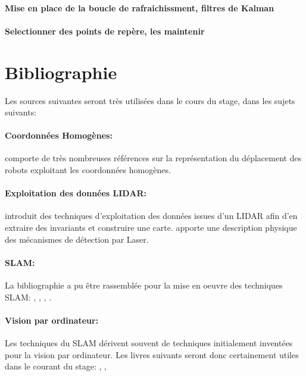 \documentclass[12pt,a4paper]{report}
\begin{document}
\paragraph{Mise en place de la boucle de rafraichissment, filtres de Kalman}

\paragraph{Selectionner des points de repère, les maintenir}

\section{Bibliographie}

Les sources suivantes seront très utilisées dans le cours du stage, dans les sujets suivants:

\paragraph{Coordonnées Homogènes:} \cite{gogu_representation_1997} comporte de très nombreuses références sur la représentation du déplacement des robots exploitant les coordonnées homogènes.

\paragraph{Exploitation des données LIDAR:} \cite{sjostedt_lidar_2011} introduit des techniques d'exploitation des données issues d'un LIDAR afin d'en extraire des invariants et construire une carte. \cite{osche_optical_2002} apporte une description physique des mécanismes de détection par Laser.


\paragraph{SLAM:} La bibliographie a pu être rassemblée pour la mise en oeuvre des techniques SLAM: \cite{nuchter_3d_2009}, \cite{giblin_computational_2001}, \cite{riisgaard_slam_2003}, \cite{corke_robotics_2011}.

\paragraph{Vision par ordinateur:} Les techniques du SLAM dérivent souvent de techniques initialement inventées pour la vision par ordinateur. Les livres suivants seront donc certainement utiles dans le courant du stage: \cite{ma_invitation_2004}, \cite{hartley_multiple_2004}, \cite{bradski_learning_2011}
\end{document}
